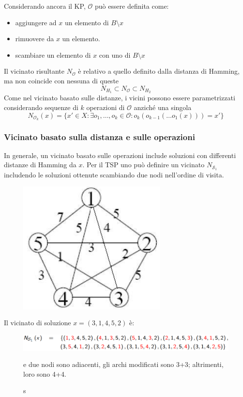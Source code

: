 \documentclass{article}
\begin{document}
Considerando ancora il KP, $\mathcal{O}$ può essere definita come:
\begin{itemize}
    \item aggiungere ad $x$ un elemento di $B\setminus x$
    \item rimuovere da $x$ un elemento.
    \item scambiare un elemento di $x$ con uno di $B\setminus x$
\end{itemize}
Il vicinato risultante $N_\mathcal{O}$ è relativo a quello definito dalla distanza
di Hamming, ma non coincide con nessuna di queste
$$N_{H_1}\subset N_\mathcal{O}\subset N_{H_2}$$
Come nel vicinato basato sulle distanze, i vicini possono essere parametrizzati
considerando sequenze di $k$ operazioni di $\mathcal{O}$ anziché una singola
$$N_{\mathcal{O}_k}(x)=\{x'\in X:\exists o_1,\dots,o_k\in\mathcal{O}:o_k(o_{k-1}(\dots o_1(x)))=x'\}$$

\subsubsection{Vicinato basato sulla distanza e sulle operazioni}
In generale, un vicinato basato sulle operazioni include soluzioni con differenti distanze di
Hamming da $x$. Per il TSP uno può definire un vicinato $N_{\mathcal{S}_1}$ includendo le
soluzioni ottenute scambiando due nodi nell'ordine di visita.
\begin{figure}[H]
    \centering
    \includegraphics[scale=0.5]{images/TSP_operationsbased.png}
\end{figure}
Il vicinato di soluzione $x=(3,1,4,5,2)$ è:
\begin{figure}[H]
    \centering
    \includegraphics[scale=0.4]{images/N_sol_tsp.png}
    \caption se due nodi sono adiacenti, gli archi modificati sono 3+3; altrimenti, loro sono 4+4.
\end{figure}
\end{document}
